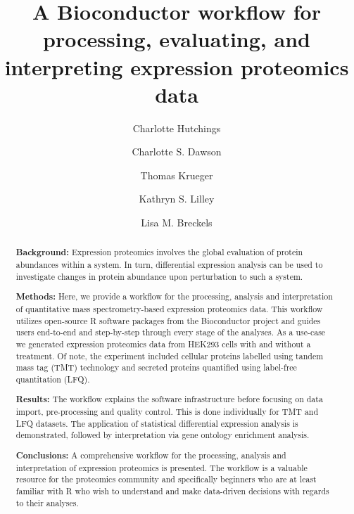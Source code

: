 \documentclass[9pt,a4paper,]{extarticle}
\begin{document}
\pagestyle{front}

\title{A Bioconductor workflow for processing, evaluating, and interpreting expression proteomics data}

\author[1]{Charlotte Hutchings}
\author[1]{Charlotte S. Dawson}
\author[2]{Thomas Krueger}
\author[1]{Kathryn S. Lilley}
\author[1]{Lisa M. Breckels}

\maketitle
\thispagestyle{front}

\begin{abstract}
\hfill\break
\textbf{Background:} Expression proteomics involves the global evaluation of protein
abundances within a system. In turn, differential expression analysis can be
used to investigate changes in protein abundance upon perturbation to such a
system.

\textbf{Methods:} Here, we provide a workflow for the processing, analysis and
interpretation of quantitative mass spectrometry-based expression proteomics
data. This workflow utilizes open-source R software packages from the
Bioconductor project and guides users end-to-end and step-by-step through every
stage of the analyses. As a use-case we generated expression proteomics data
from HEK293 cells with and without a treatment. Of note, the experiment included
cellular proteins labelled using tandem mass tag (TMT) technology and secreted
proteins quantified using label-free quantitation (LFQ).

\textbf{Results:} The workflow explains the software infrastructure before focusing
on data import, pre-processing and quality control. This is done individually
for TMT and LFQ datasets. The application of statistical differential
expression analysis is demonstrated, followed by interpretation via gene
ontology enrichment analysis.

\textbf{Conclusions:} A comprehensive workflow for the processing, analysis and
interpretation of expression proteomics is presented. The workflow is a
valuable resource for the proteomics community and specifically beginners who
are at least familiar with R who wish to understand and make data-driven
decisions with regards to their analyses.
\end{abstract}
\end{document}
